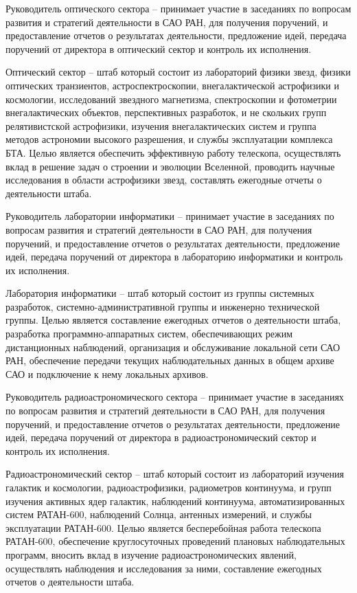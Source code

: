 Руководитель оптического сектора -- принимает участие в заседаниях по вопросам развития и стратегий деятельности в САО РАН, для получения поручений, и предоставление отчетов о результатах деятельности, предложение идей, передача поручений от директора в оптический сектор и контроль их исполнения.

Оптический сектор --  штаб который состоит из лабораторий физики звезд, физики оптических транзиентов, астроспектроскопии, внегалактической астрофизики и космологии, исследований звездного магнетизма, спектроскопии и фотометрии внегалактических объектов,  перспективных разработок, и не скольких групп релятивистской астрофизики, изучения внегалактических систем и группа методов астрономии высокого разрешения, и службы эксплуатации комплекса БТА. Целью является обеспечить эффективную работу телескопа, осуществлять вклад в решение задач о строении и эволюции Вселенной, проводить научные исследования в области астрофизики звезд, составлять ежегодные отчеты о деятельности штаба.

Руководитель лаборатории информатики -- принимает участие в заседаниях по вопросам развития и стратегий деятельности в САО РАН, для получения поручений, и предоставление отчетов о результатах деятельности, предложение идей, передача поручений от директора в лабораторию информатики и контроль их исполнения.

Лаборатория информатики -- штаб который состоит из группы системных разработок, системно-административной группы и инженерно технической группы. Целью является составление ежегодных отчетов о деятельности штаба, разработка программно-аппаратных систем, обеспечивающих режим дистанционных наблюдений, организация и обслуживание локальной сети САО РАН, обеспечение передачи текущих наблюдательных данных в общем архиве САО и подключение к нему локальных архивов.

Руководитель радиоастрономического сектора -- принимает участие в заседаниях по вопросам развития и стратегий деятельности в САО РАН, для получения поручений, и предоставление отчетов о результатах деятельности, предложение идей, передача поручений от директора в радиоастрономический сектор и контроль их исполнения.

Радиоастрономический сектор -- штаб который состоит из лабораторий изучения галактик и космологии, радиоастрофизики, радиометров континуума, и групп изучения активных ядер галактик, наблюдений континуума, автоматизированных систем РАТАН-600, наблюдений Солнца, антенных измерений, и службы эксплуатации РАТАН-600. Целью является бесперебойная работа телескопа РАТАН-600, обеспечение круглосуточных проведений плановых наблюдательных программ, вносить вклад в изучение радиоастрономических явлений, осуществлять наблюдения и исследования за ними, составление ежегодных отчетов о деятельности штаба.  


